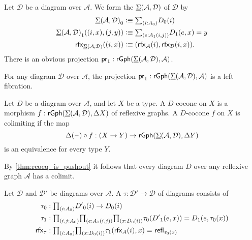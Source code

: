 \begin{defn}
Let $\mathcal{D}$ be a diagram over $\mathcal{A}$. We form the  $\underline{\Sigma}(\mathcal{A},\mathcal{D})$ of $\mathcal{D}$ by
\begin{align*}
\pts{\msm{\mathcal{A}}{\mathcal{D}}} & \defeq \sm{i:\pts{A}}\pts{D}(i) \\
\edg{\msm{\mathcal{A}}{\mathcal{D}}}((i,x),(j,y)) & \defeq \sm{e:\edg{A}(i,j)} \edg{D}(e,x)=y \\
\rfx{\msm{\mathcal{A}}{\mathcal{D}}}((i,x)) & \defeq (\rfx{\mathcal{A}}(i),\rfx{\mathcal{D}}(i,x)).
\end{align*}
There is an obvious projection $\mathsf{pr}_{1} : \mathsf{rGph}(\underline{\Sigma}(\mathcal{A},\mathcal{D}),\mathcal{A})$.
\end{defn}

\begin{lem}
For any diagram $\mathcal{D}$ over $\mathcal{A}$, the projection $\mathsf{pr}_{1} : \mathsf{rGph}(\underline{\Sigma}(\mathcal{A},\mathcal{D}),\mathcal{A})$ is a left fibration.
\end{lem}

\begin{defn}
Let $D$ be a diagram over $\mathcal{A}$, and let $X$ be a type. A $D$-cocone on $X$ is a morphism $f:\mathsf{rGph}(\underline{\Sigma}(\mathcal{A},\mathcal{D}),\Delta X)$ of reflexive graphs. A $D$-cocone $f$ on $X$ is colimiting if the map
\begin{equation*}
\Delta(\mathord{\hspace{1pt}\text{--}\hspace{1pt}})\circ f : (X\to Y)\to \mathsf{rGph}(\underline{\Sigma}(\mathcal{A},\mathcal{D}),\Delta Y)
\end{equation*}
is an equivalence for every type $Y$. 
\end{defn}

\begin{rmk}
By \cref{thm:rcoeq_is_pushout} it follows that every diagram $D$ over any reflexive graph $\mathcal{A}$ has a colimit. 
\end{rmk}

\begin{defn}
Let $\mathcal{D}$ and $\mathcal{D}'$ be diagrams over $\mathcal{A}$. A  $\tau : \mathcal{D}'\to \mathcal{D}$ of diagrams consists of
\begin{align*}
\pts{\tau} & : \prd{i:\pts{A}}\pts{D'}(i)\to\pts{D}(i) \\
\edg{\tau} & : \prd*{i,j:\pts{A}}{e:\edg{A}(i,j)}\prd{x:\pts{D}(i)}\pts{\tau}(\edg{D'}(e,x))=\edg{D}(e,\pts{\tau}(x)) \\
\rfx{\tau} & : \prd{i:\pts{A}}{x:\pts{D}(i)} \dpath{}{}{\edg{\tau}(\rfx{A}(i),x)}{\refl{\pts{\tau}(x)}}
\end{align*}
\end{defn}

